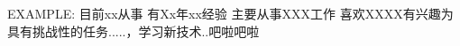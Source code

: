 

\begin{cvparagraph}

EXAMPLE:
目前xx从事
有Xx年xx经验
主要从事XXX工作
喜欢XXXX有兴趣为具有挑战性的任务.....，学习新技术..吧啦吧啦
\end{cvparagraph}
